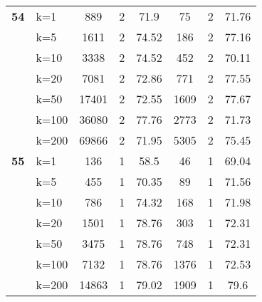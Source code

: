 \begin{table}[htbp]
\begin{tabular}{|l|l|c|c|c|c|c|c|}
    \multicolumn{1}{|r|}{\textbf{54}} & k=1 & 889 & 2 & 71.9 & 75 & 2 & 71.76 \\ 
     & k=5 & 1611 & 2 & 74.52 & 186 & 2 & 77.16 \\ 
     & k=10 & 3338 & 2 & 74.52 & 452 & 2 & 70.11 \\ 
     & k=20 & 7081 & 2 & 72.86 & 771 & 2 & 77.55 \\ 
     & k=50 & 17401 & 2 & 72.55 & 1609 & 2 & 77.67 \\ 
     & k=100 & 36080 & 2 & 77.76 & 2773 & 2 & 71.73 \\ 
     & k=200 & 69866 & 2 & 71.95 & 5305 & 2 & 75.45 \\ \hline
    \multicolumn{1}{|r|}{\textbf{55}} & k=1 & 136 & 1 & 58.5 & 46 & 1 & 69.04 \\ 
     & k=5 & 455 & 1 & 70.35 & 89 & 1 & 71.56 \\ 
     & k=10 & 786 & 1 & 74.32 & 168 & 1 & 71.98 \\ 
     & k=20 & 1501 & 1 & 78.76 & 303 & 1 & 72.31 \\ 
     & k=50 & 3475 & 1 & 78.76 & 748 & 1 & 72.31 \\ 
     & k=100 & 7132 & 1 & 78.76 & 1376 & 1 & 72.53 \\ 
     & k=200 & 14863 & 1 & 79.02 & 1909 & 1 & 79.6 \\ \hline
    \end{tabular}
\end{table}
